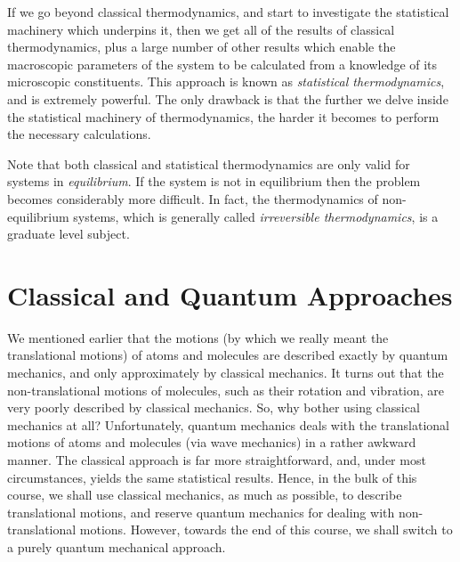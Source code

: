 If we go beyond classical thermodynamics, and start to investigate the
statistical machinery which underpins it, then we get all of the
results of classical
thermodynamics, plus a large number of other results which enable the 
macroscopic parameters of the system to be calculated from a knowledge
of its microscopic constituents. This approach is known as
{\em statistical thermodynamics}, and is extremely powerful.
 The only drawback 
is that the further we delve inside the statistical machinery
of thermodynamics, the harder it becomes to perform the necessary
calculations.

Note
 that both classical and statistical thermodynamics are
only valid for systems in {\em equilibrium}. 
If the system is not in equilibrium
then the problem becomes considerably more difficult. 
In fact, the thermodynamics of 
non-equilibrium systems, which
 is generally called {\em irreversible thermodynamics}, 
is a graduate level subject.

\section{Classical and Quantum Approaches}
We mentioned earlier that the 
motions (by which we really meant the translational motions) 
of atoms and molecules are described exactly
by quantum mechanics, and only  approximately by classical mechanics.
It turns out that the non-translational motions 
of molecules, such as their rotation
and vibration, are  very poorly described by classical mechanics.
So, why bother using classical mechanics at all? Unfortunately, quantum
mechanics deals with the translational motions of atoms and
molecules (via wave mechanics) in a rather awkward manner. The
classical approach is far more straightforward, and, under most
circumstances, yields the same statistical results. Hence, in the
bulk of this course,
we shall use classical mechanics, as much
as possible, to describe translational motions, and reserve quantum
mechanics for dealing with  non-translational motions. However, towards
the end of this course, we shall switch to a purely quantum mechanical
approach.


